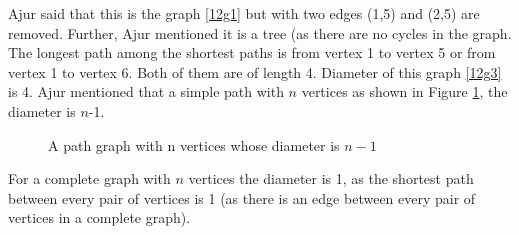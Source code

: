 Ajur said that this is the graph \ref{12g1} but with two edges (1,5) and (2,5) are removed. Further, Ajur mentioned it is a tree (as there are no cycles in the graph. The longest path among the shortest paths is from vertex 1 to vertex 5 or from vertex 1 to vertex 6. Both of them are of length 4. Diameter of this graph \ref{12g3} is 4. Ajur mentioned that a simple path with $n$ vertices as shown in Figure \ref{12g4}, the diameter is $n$-1.

\begin{figure}
\begin{center}
\caption{ A path graph with n vertices whose diameter is $n-1$ }\label{12g4}
\end{center}
\end{figure}

For a complete graph with $n$ vertices the diameter is 1, as the shortest path between every pair of vertices is 1 (as there is an edge between every pair of vertices in a complete graph). 

